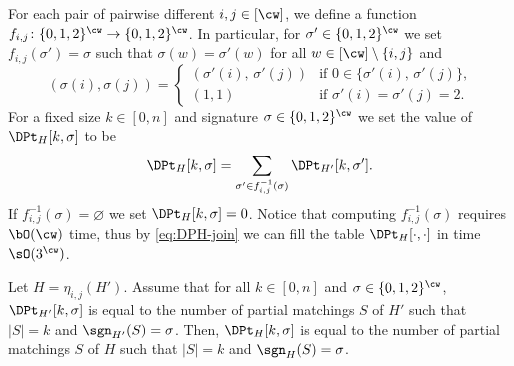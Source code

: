 For each pair of pairwise different $i,j \in [\cw]$,
we define a function $f_{i,j} \colon \{0,1,2\}^{\cw} \to \{0,1,2\}^{\cw}$.
In particular, for $\sigma' \in \{0,1,2\}^{\cw}$ we set $f_{i,j}(\sigma') = \sigma$
such that $\sigma(w) = \sigma'(w)$ for all $w \in [\cw] \setminus \{i,j\}$
and
\[
    (\sigma(i),\sigma(j)) =
        \begin{cases}
            (\sigma'(i), \, \sigma'(j)) &\text{if $0 \in \{\sigma'(i), \, \sigma'(j)\}$,}\\
            (1,1)                       &\text{if $\sigma'(i) = \sigma'(j) = 2$}.
        \end{cases}
\]
For a fixed size $k \in [0,n]$ and signature $\sigma \in \{0,1,2\}^{\cw}$ we set the value of $\DPt_H[k,\sigma]$ to be
\begin{equation}\label{eq:DPH-join}
    \DPt_H[k,\sigma] = \sum_{\sigma' \in f^{-1}_{i,j} (\sigma)} \DPt_{H'}[k,\sigma'].
\end{equation}
If $f^{-1}_{i,j}(\sigma) = \varnothing$ we set $\DPt_H[k,\sigma] = 0$.
Notice that computing $f^{-1}_{i,j}(\sigma)$ requires $\bO(\cw)$ time,
thus by \cref{eq:DPH-join} we can fill the table $\DPt_H[\cdot,\cdot]$ in time $\sO(3^{\cw})$.

\begin{lemmarep}[\appsymb]\label{lemma:induced:cw:join-correctness}
    Let $H = \eta_{i,j}(H')$.
    Assume that for all $k \in [0,n]$ and $\sigma \in \{0,1,2\}^{\cw}$,
    $\DPt_{H'}[k,\sigma]$ is equal to the number of partial matchings $S$ of $H'$ such that $|S|=k$ and $\sgn_{H'}(S) = \sigma$.
    Then, $\DPt_H[k,\sigma]$ is equal to the number of partial matchings $S$ of $H$ such that $|S|=k$ and $\sgn_H(S) = \sigma$.
\end{lemmarep}

